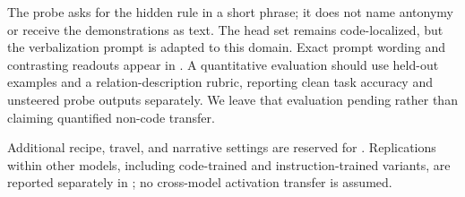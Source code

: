 The probe asks for the hidden rule in a short phrase; it does not name antonymy or receive the demonstrations as text. The head set remains code-localized, but the verbalization prompt is adapted to this domain. Exact prompt wording and contrasting readouts appear in . A quantitative evaluation should use held-out examples and a relation-description rubric, reporting clean task accuracy and unsteered probe outputs separately. We leave that evaluation pending rather than claiming quantified non-code transfer.

Additional recipe, travel, and narrative settings are reserved for . Replications within other models, including code-trained and instruction-trained variants, are reported separately in ; no cross-model activation transfer is assumed.
